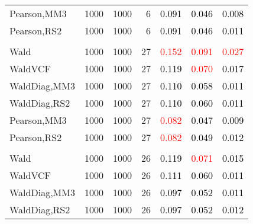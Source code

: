 \documentclass[
]{article}
\begin{document}
\begin{table}[H]
{\begin{tabular}[t]{lrrrrrr}
\hspace{1em}Pearson,MM3 & 1000 & 1000 & 6 & \textcolor{black}{0.091} & \textcolor{black}{0.046} & \textcolor{black}{0.008}\\
\hspace{1em}Pearson,RS2 & 1000 & 1000 & 6 & \textcolor{black}{0.091} & \textcolor{black}{0.046} & \textcolor{black}{0.011}\\
\addlinespace[0.3em]
\multicolumn{7}{l}{\textbf{1F 15V}}\\
\hspace{1em}Wald & 1000 & 1000 & 27 & \textcolor{red}{0.152} & \textcolor{red}{0.091} & \textcolor{red}{0.027}\\
\hspace{1em}WaldVCF & 1000 & 1000 & 27 & \textcolor{black}{0.119} & \textcolor{red}{0.070} & \textcolor{black}{0.017}\\
\hspace{1em}WaldDiag,MM3 & 1000 & 1000 & 27 & \textcolor{black}{0.110} & \textcolor{black}{0.058} & \textcolor{black}{0.011}\\
\hspace{1em}WaldDiag,RS2 & 1000 & 1000 & 27 & \textcolor{black}{0.110} & \textcolor{black}{0.060} & \textcolor{black}{0.011}\\
\hspace{1em}Pearson,MM3 & 1000 & 1000 & 27 & \textcolor{red}{0.082} & \textcolor{black}{0.047} & \textcolor{black}{0.009}\\
\hspace{1em}Pearson,RS2 & 1000 & 1000 & 27 & \textcolor{red}{0.082} & \textcolor{black}{0.049} & \textcolor{black}{0.012}\\
\addlinespace[0.3em]
\multicolumn{7}{l}{\textbf{2F 10V}}\\
\hspace{1em}Wald & 1000 & 1000 & 26 & \textcolor{black}{0.119} & \textcolor{red}{0.071} & \textcolor{black}{0.015}\\
\hspace{1em}WaldVCF & 1000 & 1000 & 26 & \textcolor{black}{0.111} & \textcolor{black}{0.060} & \textcolor{black}{0.011}\\
\hspace{1em}WaldDiag,MM3 & 1000 & 1000 & 26 & \textcolor{black}{0.097} & \textcolor{black}{0.052} & \textcolor{black}{0.011}\\
\hspace{1em}WaldDiag,RS2 & 1000 & 1000 & 26 & \textcolor{black}{0.097} & \textcolor{black}{0.052} & \textcolor{black}{0.012}\\

\end{tabular}}
\end{table}
\end{document}
